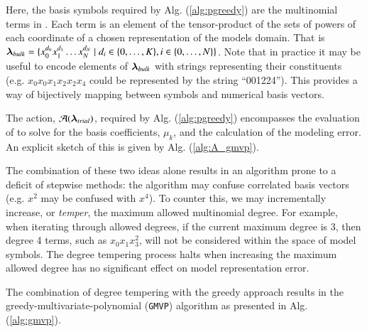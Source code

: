 \documentclass[twocolumn,aps,prd,floatfix,preprintnumbers,a4paper,nofootinbib,
superscriptaddress,10pt]{revtex4-1}
\def\gmvp#1{greedy-multivariate-polynomial#1
  (\texttt{GMVP}#1)\gdef\gmvp{\texttt{GMVP}}}
\begin{document}
%
\par Here, the basis symbols required by Alg. (\ref{alg:pgreedy}) are the multinomial terms in .
%
Each term is an element of the tensor-product of the sets of powers of each coordinate of a chosen representation of the models domain. That is ${\bm{\lambda}}_{bulk} = \{x_0^{d_0} x_1^{d_1} \ldots x_N^{d_N} \mid d_i \in \{0,\ldots,K\}, i \in \{0,\ldots,N\}\}$.
%
Note that in practice it may be useful to encode elements of ${\bm{\lambda}}_{bulk}$ with strings representing their constituents (e.g. $x_0 x_0 x_1 x_2 x_2 x_4$ could be represented by the string ``001224''). This provides a way of bijectively mapping between symbols and numerical basis vectors.
%
\par The action, $\mathcal{A}({\bm{\lambda}}_{trial})$, required by Alg. (\ref{alg:pgreedy}) encompasses the evaluation of  to solve for the basis coefficients, $\mu_k$, and the calculation of the modeling error.
%
An explicit sketch of this is given by Alg. (\ref{alg:A_gmvp}).
%
\par The combination of these two ideas alone results in an algorithm prone to a deficit of stepwise methods: the algorithm may confuse correlated basis vectors (e.g. $x^2$ may be confused with $x^4$).
%
To counter this, we may incrementally increase, or \textit{temper}, the maximum allowed multinomial degree.
%
For example, when iterating through allowed degrees, if the current maximum degree is 3, then degree 4 terms, such as $x_0x_1x_3^2$, will not be considered within the space of model symbols.
%
The degree tempering process halts when increasing the maximum allowed degree has no significant effect on model representation error.
%
\par The combination of degree tempering with the greedy approach results in the \gmvp{} algorithm as presented in Alg. (\ref{alg:gmvp}).
%
%
\end{document}
